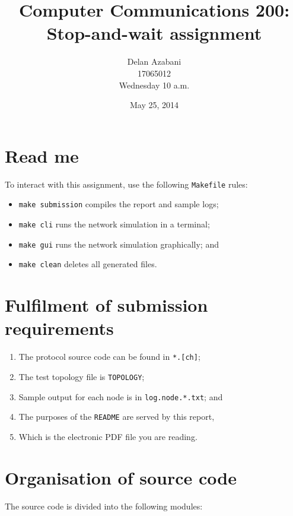 \documentclass[a4paper,12pt,titlepage]{article}
\title{Computer Communications 200:\\
       Stop-and-wait assignment}
\date{May 25, 2014}
\author{Delan Azabani\\17065012\\Wednesday 10 a.m.}
\begin{document}

\maketitle


\section{Read me}

To interact with this assignment, use the following \texttt{Makefile} rules:

\begin{itemize}
	\item \texttt{make submission} compiles the report and sample logs;
	\item \texttt{make cli} runs the network simulation in a terminal;
	\item \texttt{make gui} runs the network simulation graphically; and
	\item \texttt{make clean} deletes all generated files.
\end{itemize}

\section{Fulfilment of submission requirements}

\begin{enumerate}
	\item The protocol source code can be found in \texttt{*.[ch]};
	\item The test topology file is \texttt{TOPOLOGY};
	\item Sample output for each node is in \texttt{log.node.*.txt}; and
	\item The purposes of the \texttt{README} are served by this report,
	\item Which is the electronic PDF file you are reading.
\end{enumerate}

\section{Organisation of source code}

The source code is divided into the following modules:
\end{document}
